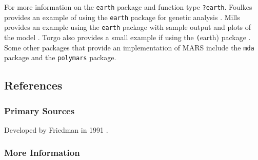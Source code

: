 For more information on the \texttt{earth} package and function type \texttt{?earth}. Foulkes provides an example of using the \texttt{earth} package for genetic analysis \cite{Foulkes2009}. Mills provides an example using the \texttt{earth} package with sample output and plots of the model \cite{Mills2010}. Torgo also provides a small example if using the \texttt(earth) package \cite{Torgo2009}. 
Some other packages that provide an implementation of MARS include the \texttt{mda} package and the \texttt{polymars} package.


\subsection{References}

\subsubsection{Primary Sources}

Developed by Friedman in 1991 \cite{Friedman1991}.

\subsubsection{More Information}





